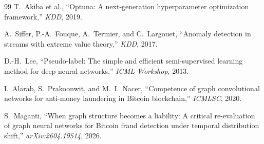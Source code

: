 \documentclass[conference]{IEEEtran}
\begin{document}
\begin{thebibliography}{99}
T.~Akiba et al., ``Optuna: A next-generation hyperparameter optimization
framework,'' \textit{KDD}, 2019.

A.~Siffer, P.-A.~Fouque, A.~Termier, and C.~Largouet, ``Anomaly detection
in streams with extreme value theory,'' \textit{KDD}, 2017.

D.-H.~Lee, ``Pseudo-label: The simple and efficient semi-supervised learning
method for deep neural networks,'' \textit{ICML Workshop}, 2013.

I.~Alarab, S.~Prakoonwit, and M.~I.~Nacer, ``Competence of graph
convolutional networks for anti-money laundering in Bitcoin blockchain,''
\textit{ICMLSC}, 2020.

S.~Maganti, ``When graph structure becomes a liability: A critical
re-evaluation of graph neural networks for Bitcoin fraud detection under
temporal distribution shift,'' \textit{arXiv:2604.19514}, 2026.

\end{thebibliography}
\end{document}
